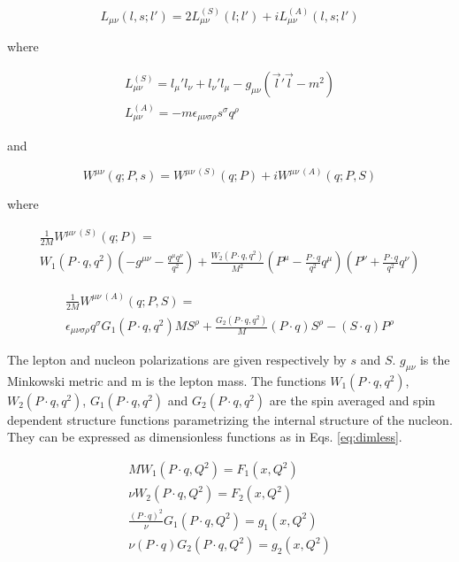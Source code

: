 \begin{equation}
  L_{\mu\nu}(l,s;l') = 2{L^{(S)}_{\mu\nu}(l;l')+iL^{(A)}_{\mu\nu}(l,s;l')}
\end{equation}

where

\begin{equation}
  \begin{split}
    L^{(S)}_{\mu\nu} = l_{\mu}'l_{\nu} + l_{\nu}'l_{\mu} - g_{\mu\nu}(\vec{l}'\vec{l}-m^2) \\
    L^{(A)}_{\mu\nu} = -m\epsilon_{\mu\nu\sigma\rho}s^{\sigma}q^{\rho}
  \end{split}
\end{equation}

and

\begin{equation}
  W^{\mu\nu}(q;P,s) = W^{\mu\nu\ (S)}(q;P) + iW^{\mu\nu\ (A)}(q;P,S)
\end{equation}

where

\begin{equation}
  \begin{split}
    \frac{1}{2M}W^{\mu\nu\ (S)}(q;P) = \\
    W_1(P\cdot q,q^2)\left(-g^{\mu\nu}-\frac{q^{\mu}q^{\nu}}{q^2}\right)+\frac{W_2(P\cdot q,q^2)}{M^2}\left(P^{\mu}-\frac{P\cdot q}{q^2}q^{\mu}\right)\left(P^{\nu}+\frac{P\cdot q}{q^2}q^{\nu}\right)
  \end{split}
\end{equation}

\begin{equation}
  \begin{split}
    \frac{1}{2M}W^{\mu\nu\ (A)}(q;P,S) = \\
    \epsilon_{\mu\nu\sigma\rho}q^{\sigma}{G_1(P\cdot q,q^2)MS^{\rho}+\frac{G_2(P\cdot q,q^2)}{M}(P\cdot q)S^{\rho}-(S\cdot q)P^{\rho}}
  \end{split}
\end{equation}

The lepton and nucleon polarizations are given respectively by $s$ and $S$. $g_{\mu\nu}$ is the
Minkowski metric and m is the lepton mass. The functions $W_1(P\cdot q,q^2)$, $W_2(P\cdot q,q^2)$,
$G_1(P\cdot q,q^2)$ and $G_2(P\cdot q,q^2)$ are the spin averaged and spin dependent structure functions
parametrizing the internal structure of the nucleon. They can be expressed as dimensionless functions as
in Eqs. \ref{eq:dimless}.

\begin{equation}
  \begin{split}
    MW_1(P\cdot q,Q^2)=F_1(x,Q^2) \\
    \nu W_2(P\cdot q,Q^2)=F_2(x,Q^2) \\
    \frac{(P\cdot q)^2}{\nu}G_1(P\cdot q,Q^2)=g_1(x,Q^2) \\
    \nu(P\cdot q)G_2(P\cdot q,Q^2)=g_2(x,Q^2) \\
  \end{split}
  \label{eq:dimless}
\end{equation}

